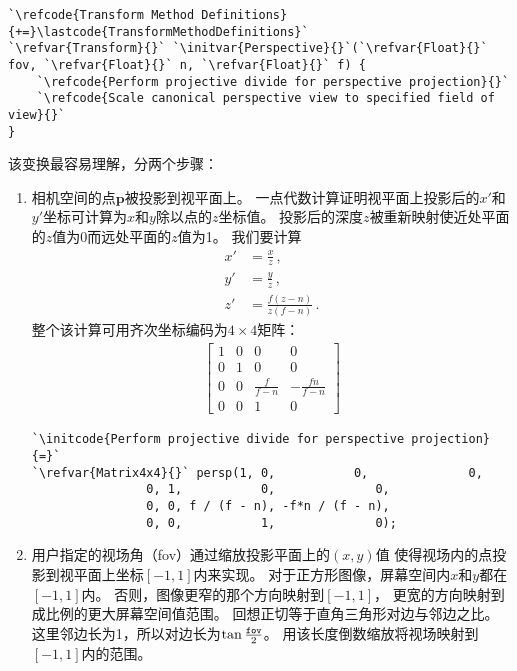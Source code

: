 \begin{lstlisting}
`\refcode{Transform Method Definitions}{+=}\lastcode{TransformMethodDefinitions}`
`\refvar{Transform}{}` `\initvar{Perspective}{}`(`\refvar{Float}{}` fov, `\refvar{Float}{}` n, `\refvar{Float}{}` f) {
    `\refcode{Perform projective divide for perspective projection}{}`
    `\refcode{Scale canonical perspective view to specified field of view}{}`
}
\end{lstlisting}
该变换最容易理解，分两个步骤：
\begin{enumerate}
    \item 相机空间的点$\bm p$被投影到视平面上。
          一点代数计算证明视平面上投影后的$x'$和$y'$坐标可计算为$x$和$y$除以点的$z$坐标值。
          投影后的深度$z$被重新映射使近处平面的$z$值为0而远处平面的$z$值为1。
          我们要计算
          \begin{align*}
              x' & =\frac{x}{z}\, ,           \\
              y' & =\frac{y}{z}\, ,           \\
              z' & =\frac{f(z-n)}{z(f-n)}\, .
          \end{align*}
          整个该计算可用齐次坐标编码为$4\times4$矩阵：
          \begin{align*}
              \left[\begin{array}{cccc}
                      1 & 0 & 0             & 0               \\
                      0 & 1 & 0             & 0               \\
                      0 & 0 & \frac{f}{f-n} & -\frac{fn}{f-n} \\
                      0 & 0 & 1             & 0
                  \end{array}\right]
          \end{align*}
          \begin{lstlisting}
`\initcode{Perform projective divide for perspective projection}{=}`
`\refvar{Matrix4x4}{}` persp(1, 0,           0,              0,
                0, 1,           0,              0,
                0, 0, f / (f - n), -f*n / (f - n),
                0, 0,           1,              0);
\end{lstlisting}
    \item 用户指定的视场角（{\ttfamily fov}）通过缩放投影平面上的$(x,y)$值
          使得视场内的点投影到视平面上坐标$[-1,1]$内来实现。
          对于正方形图像，屏幕空间内$x$和$y$都在$[-1,1]$内。
          否则，图像更窄的那个方向映射到$[-1,1]$，
          更宽的方向映射到成比例的更大屏幕空间值范围。
          回想正切等于直角三角形对边与邻边之比。
          这里邻边长为1，所以对边长为$\tan\frac{\text{\ttfamily fov}}{2}$。
          用该长度倒数缩放将视场映射到$[-1,1]$内的范围。
\end{enumerate}
